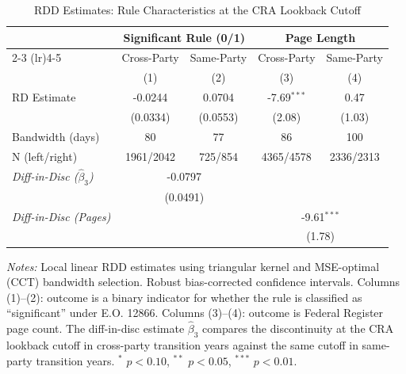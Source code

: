 \begin{table}[H]
\centering
\caption{RDD Estimates: Rule Characteristics at the CRA Lookback Cutoff}
\label{tab:main}
\begin{threeparttable}
\begin{tabular}{lcccc}
\toprule
 & \multicolumn{2}{c}{Significant Rule (0/1)} & \multicolumn{2}{c}{Page Length} \\
\cmidrule(lr){2-3} \cmidrule(lr){4-5}
 & Cross-Party & Same-Party & Cross-Party & Same-Party \\
 & (1) & (2) & (3) & (4) \\
\midrule
RD Estimate & -0.0244 & 0.0704 & -7.69$^{***}$ & 0.47 \\
 & (0.0334) & (0.0553) & (2.08) & (1.03) \\

Bandwidth (days) & 80 & 77 & 86 & 100 \\
N (left/right) & 1961/2042 & 725/854 & 4365/4578 & 2336/2313 \\
\midrule
\textit{Diff-in-Disc ($\hat{\beta}_3$)} & \multicolumn{2}{c}{-0.0797} & \multicolumn{2}{c}{} \\
 & \multicolumn{2}{c}{(0.0491)} & \multicolumn{2}{c}{} \\
\textit{Diff-in-Disc (Pages)} & \multicolumn{2}{c}{} & \multicolumn{2}{c}{-9.61$^{***}$} \\
 & \multicolumn{2}{c}{} & \multicolumn{2}{c}{(1.78)} \\
\bottomrule
\end{tabular}
\begin{tablenotes}[flushleft]
\small
\item \textit{Notes:} Local linear RDD estimates using triangular kernel and MSE-optimal (CCT) bandwidth selection. Robust bias-corrected confidence intervals. Columns (1)--(2): outcome is a binary indicator for whether the rule is classified as ``significant'' under E.O. 12866. Columns (3)--(4): outcome is Federal Register page count. The diff-in-disc estimate $\hat{\beta}_3$ compares the discontinuity at the CRA lookback cutoff in cross-party transition years against the same cutoff in same-party transition years. $^{*}$ $p<0.10$, $^{**}$ $p<0.05$, $^{***}$ $p<0.01$.
\end{tablenotes}
\end{threeparttable}
\end{table}
